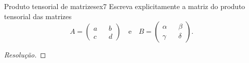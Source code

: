 \begin{exercício}{Produto tensorial de matrizes}{ex7}
    Escreva explicitamente a matriz do produto tensorial das matrizes
    \begin{equation*}
        A = \begin{pmatrix}
           a && b\\ c && d
        \end{pmatrix}
        \quad\text{e}\quad
        B = \begin{pmatrix}
           \alpha && \beta\\ \gamma && \delta
        \end{pmatrix}.
    \end{equation*}
\end{exercício}
\begin{proof}[Resolução]
    
\end{proof}
